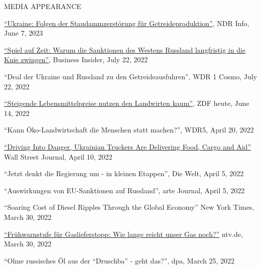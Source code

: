 \documentclass{article}
\begin{document}

\begin{minipage}[t]{0.12\textwidth}
    {\selectfont MEDIA \mbox APPEARANCE} \\
\end{minipage}
\hspace{5mm}
\begin{minipage}[t]{0.8\textwidth}
    \href{https://www.ndr.de/nachrichten/info/Wirtschaft-Folgen-der-Staudammzerstoerung-fuer-Getreideproduktion,audio1398696.html}{``Ukraine: Folgen der Staudammzerstörung für Getreideproduktion''}, NDR Info, June 7, 2023 \par
    \href{https://www.businessinsider.de/politik/welt/spiel-auf-zeit-warum-die-bundesregierung-und-experten-glauben-dass-die-sanktionen-des-westens-russland-langfristig-in-die-knie-zwingen-werden/}{``Spiel auf Zeit: Warum die Sanktionen des Westens Russland langfristig in die Knie zwingen''}, Business Insider, July 22, 2022 \par
    ``Deal der Ukraine und Russland zu den Getreideausfuhren'', WDR 1 Cosmo, July 22, 2022 \par
    \href{https://www.zdf.de/nachrichten/heute-19-uhr/bauerntag-luebeck-oezdemir-video-100.html}{``Steigende Lebensmittelpreise nutzen den Landwirten kaum''}, ZDF heute, June 14, 2022 \par
    ``Kann Öko-Landwirtschaft die Menschen statt machen?'', WDR5, April 20, 2022 \par
    \href{https://www.wsj.com/articles/driving-into-danger-ukrainian-truckers-are-delivering-food-cargo-and-aid-11649595601}{``Driving Into Danger, Ukrainian Truckers Are Delivering Food, Cargo and Aid''} Wall Street Journal, April 10, 2022 \par
    ``Jetzt denkt die Regierung um - in kleinen Etappen'', Die Welt, April 5, 2022 \par
    ``Auswirkungen von EU-Sanktionen auf Russland'', arte Journal, April 5, 2022 \par
    ``Soaring Cost of Diesel Ripples Through the Global Economy'' New York Times, March 30, 2022 \par
    \href{https://www.n-tv.de/wirtschaft/Wie-lange-reicht-unser-Gas-noch-article23234226.html}{``Frühwarnstufe für Gaslieferstopp: Wie lange reicht unser Gas noch?''} ntv.de, March 30, 2022 \par
    ``Ohne russisches Öl aus der ``Druschba'' - geht das?'', dpa, March 25, 2022 \par

\end{minipage}
\end{document}
